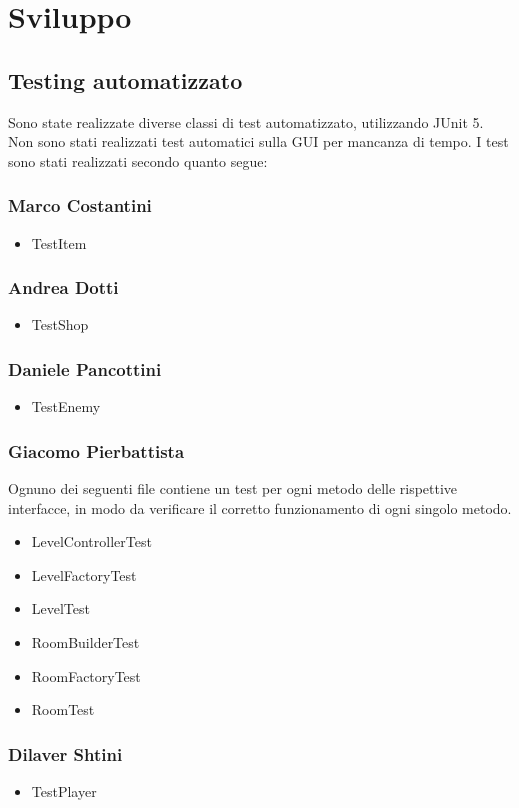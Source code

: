\documentclass[a4paper,12pt]{report}
\begin{document}
\chapter{Sviluppo}
\section{Testing automatizzato}
Sono state realizzate diverse classi di test automatizzato, utilizzando JUnit 5.
Non sono stati realizzati test automatici sulla GUI per mancanza di tempo.
I test sono stati realizzati secondo quanto segue:
\subsection*{Marco Costantini}
\begin{itemize}
    \item TestItem
\end{itemize}
\subsection*{Andrea Dotti}
\begin{itemize}
    \item TestShop
\end{itemize}
\subsection*{Daniele Pancottini}
\begin{itemize}
    \item TestEnemy
\end{itemize}
\subsection*{Giacomo Pierbattista}
Ognuno dei seguenti file contiene un test per ogni metodo delle rispettive interfacce, in modo da verificare
il corretto funzionamento di ogni singolo metodo.
\begin{itemize}
    \item LevelControllerTest
    \item LevelFactoryTest
    \item LevelTest
    \item RoomBuilderTest
    \item RoomFactoryTest
    \item RoomTest
\end{itemize}

\subsection*{Dilaver Shtini}
\begin{itemize}
    \item TestPlayer
\end{itemize}
\end{document}
